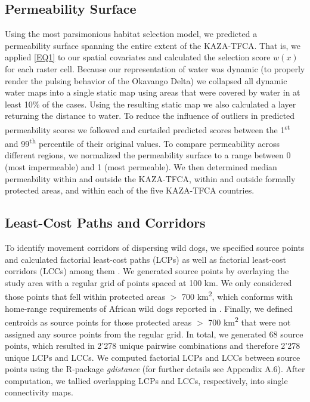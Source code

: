 \documentclass[abstract=on,10pt,a4paper,bibliography=totocnumbered]{article}
\begin{document}
\subsection{Permeability Surface}
Using the most parsimonious habitat selection model, we predicted a permeability
surface spanning the entire extent of the KAZA-TFCA. That is, we applied
\ref{EQ1} to our spatial covariates and calculated the selection score \(w(x)\)
for each raster cell. Because our representation of water was dynamic (to
properly render the pulsing behavior of the Okavango Delta) we collapsed all
dynamic water maps into a single static map using areas that were covered by
water in at least 10\% of the cases. Using the resulting static map we also
calculated a layer returning the distance to water. To reduce the influence of
outliers in predicted permeability scores we followed \cite{Squires.2013} and
curtailed predicted scores between the 1\textsuperscript{st} and
99\textsuperscript{th} percentile of their original values. To compare
permeability across different regions, we normalized the permeability surface to
a range between 0 (most impermeable) and 1 (most permeable). We then determined
median permeability within and outside the KAZA-TFCA, within and outside
formally protected areas, and within each of the five KAZA-TFCA countries.

\subsection{Least-Cost Paths and Corridors}
To identify movement corridors of dispersing wild dogs, we specified source
points and calculated factorial least-cost paths (LCPs) as well as factorial
least-cost corridors (LCCs) among them \citep{Elliot.2014}. We generated source
points by overlaying the study area with a regular grid of points spaced at 100
km. We only considered those points that fell within protected areas \(>\) 700
km\textsuperscript{2}, which conforms with home-range requirements of African
wild dogs reported in \cite{Pomilia.2015}. Finally, we defined centroids as
source points for those protected areas \(>\) 700 km\textsuperscript{2} that
were not assigned any source points from the regular grid. In total, we
generated 68 source points, which resulted in 2'278 unique pairwise combinations
and therefore 2'278 unique LCPs and LCCs. We computed factorial LCPs and LCCs
between source points using the R-package \textit{gdistance} (for further
details see Appendix A.6). After computation, we tallied overlapping LCPs and
LCCs, respectively, into single connectivity maps.
\end{document}
